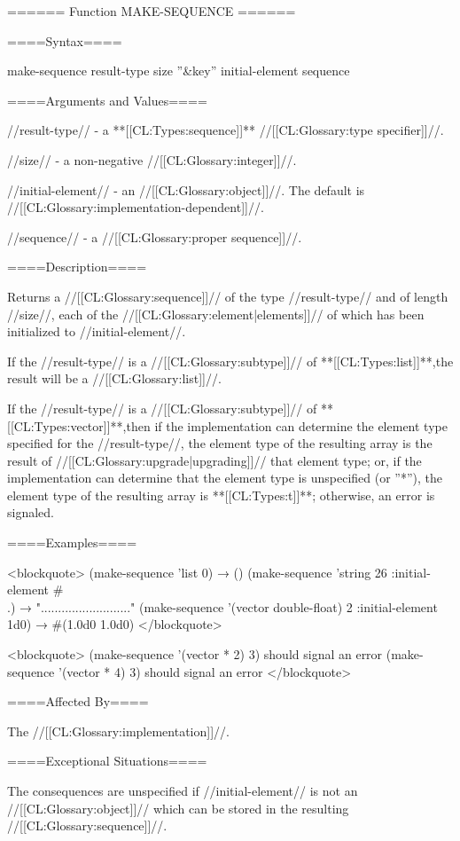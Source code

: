 ====== Function MAKE-SEQUENCE ======

====Syntax====

\DefunWithValues make-sequence {result-type size ''&key'' initial-element} {sequence}

====Arguments and Values====

//result-type// - a **[[CL:Types:sequence]]** //[[CL:Glossary:type specifier]]//.

//size// - a non-negative //[[CL:Glossary:integer]]//.

//initial-element// - an //[[CL:Glossary:object]]//. The default is //[[CL:Glossary:implementation-dependent]]//.

//sequence// - a //[[CL:Glossary:proper sequence]]//.

====Description====

Returns a //[[CL:Glossary:sequence]]// of the type //result-type// and of length //size//, each of the //[[CL:Glossary:element|elements]]// of which has been initialized to //initial-element//.

If the //result-type// is a //[[CL:Glossary:subtype]]// of **[[CL:Types:list]]**,the result will be a //[[CL:Glossary:list]]//.

If the //result-type// is a //[[CL:Glossary:subtype]]// of **[[CL:Types:vector]]**,then if the implementation can determine the element type specified for the //result-type//, the element type of the resulting array is the result of //[[CL:Glossary:upgrade|upgrading]]// that element type; or, if the implementation can determine that the element type is unspecified (or ''*''), the element type of the resulting array is **[[CL:Types:t]]**; otherwise, an error is signaled.

====Examples====

<blockquote> (make-sequence 'list 0) → () (make-sequence 'string 26 :initial-element #\\.) → ".........................." (make-sequence '(vector double-float) 2 :initial-element 1d0) → #(1.0d0 1.0d0) </blockquote>

<blockquote> (make-sequence '(vector * 2) 3) should signal an error (make-sequence '(vector * 4) 3) should signal an error </blockquote>

====Affected By====

The //[[CL:Glossary:implementation]]//.

====Exceptional Situations====

The consequences are unspecified if //initial-element// is not an //[[CL:Glossary:object]]// which can be stored in the resulting //[[CL:Glossary:sequence]]//.

